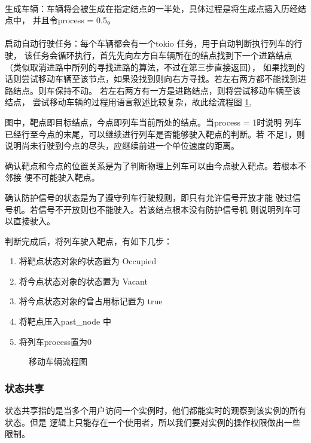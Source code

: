 \paragraph{}生成车辆：车辆将会被生成在指定结点的一半处，具体过程是将生成点插入历经结点中，
并且令process = 0.5。

\paragraph{}启动自动行驶任务：每个车辆都会有一个tokio 任务，用于自动判断执行列车的行驶，
该任务会循环执行，首先先向左方自车辆所在的结点找到下一个进路结点（类似取消进路中所列的寻找进路的算法，不过在第三步直接返回），
如果找到的话则尝试移动车辆至该节点，如果没找到则向右方寻找。若左右两方都不能找到进路结点。则车保持不动。
若左右两方有一方是进路结点，则将尝试移动车辆至该结点，
尝试移动车辆的过程用语言叙述比较复杂，故此绘流程图 \ref{tmf},

图中，靶点即目标结点，今点即列车当前所处的结点。当process = 1时说明
列车已经行至今点的末尾，可以继续进行列车是否能够驶入靶点的判断。若
不足1，则说明尚未行驶到今点的尽头，应继续前进一个单位速度的距离。

确认靶点和今点的位置关系是为了判断物理上列车可以由今点驶入靶点。若根本不邻接
便不可能驶入靶点。

确认防护信号的状态是为了遵守列车行驶规则，即只有允许信号开放才能
驶过信号机。若信号不开放则也不能驶入。若该结点根本没有防护信号机
则说明列车可以直接驶入。

判断完成后，将列车驶入靶点，有如下几步：

\begin{enumerate}[\indent i.]
    \item 将靶点状态对象的状态置为 Occupied
    \item 将今点状态对象的状态置为 Vacant
    \item 将今点状态对象的曾占用标记置为 true
    \item 将靶点压入past\_node 中
    \item 将列车process置为0
\end{enumerate}

\begin{figure}[htbp!]
    \centering
    
    \caption{\label{tmf}移动车辆流程图}
\end{figure}

\subsubsection{状态共享}
状态共享指的是当多个用户访问一个实例时，他们都能实时的观察到该实例的所有状态。但是
逻辑上只能存在一个使用者，所以我们要对实例的操作权限做出一些限制。

